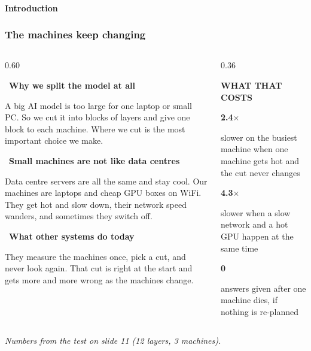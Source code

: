 \documentclass[aspectratio=169,11pt]{beamer}
\newcommand{\kefoot}[1]{%
  \vfill{\scriptsize\itshape\color{kemuted}#1}%
}
\newcommand{\kecard}[3][kemist]{%
  \begin{beamercolorbox}[wd=#2,sep=6pt,rounded=true]{}%
    \colorbox{#1}{\begin{minipage}{\dimexpr#2-14pt\relax}#3\end{minipage}}%
  \end{beamercolorbox}}
\newcommand{\kedot}[2][keamber]{%
  \tikz[baseline=(n.base)]{\node[circle,fill=#1,text=white,inner sep=1.6pt,
    font=\scriptsize\bfseries,minimum size=1.6em] (n) {#2};}}
\newcommand{\kehead}[1]{{\bfseries\color{keink}#1}}
\newcommand{\kesub}[1]{{\footnotesize\color{kebody}#1}}
\begin{document}
\begin{frame}[shrink=20]
  \framesubtitle{Introduction}
  \frametitle{The machines keep changing}
  \begin{columns}[T]
  \begin{column}{0.60\textwidth}
    \kecard{\textwidth}{%
      \kedot[keteal]{1}\ \kehead{Why we split the model at all}\par\vspace{0.3em}
      \kesub{A big AI model is too large for one laptop or small PC. So we
      cut it into blocks of layers and give one block to each machine. Where we
      cut is the most important choice we make.}}\vspace{0.4em}
    \kecard{\textwidth}{%
      \kedot[keteal]{2}\ \kehead{Small machines are not like data centres}\par\vspace{0.3em}
      \kesub{Data centre servers are all the same and stay cool. Our
      machines are laptops and cheap GPU boxes on WiFi. They get hot and slow
      down, their network speed wanders, and sometimes they switch off.}}\vspace{0.4em}
    \kecard{\textwidth}{%
      \kedot{3}\ \kehead{What other systems do today}\par\vspace{0.3em}
      \kesub{They measure the machines once, pick a cut, and never look
      again. That cut is right at the start and gets more and more wrong as the
      machines change.}}
  \end{column}
  \begin{column}{0.36\textwidth}
    \colorbox{keink}{\begin{minipage}{\dimexpr\textwidth-14pt\relax}
      \vspace{0.4em}
      {\scriptsize\bfseries\color{keamber}WHAT THAT COSTS}\par\vspace{0.8em}
      {\headfont\Huge\bfseries\color{white}2.4$\times$}\par
      {\scriptsize\color{white!62!keink}slower on the busiest machine when
       one machine gets hot and the cut never changes}\par\vspace{0.9em}
      {\headfont\Huge\bfseries\color{white}4.3$\times$}\par
      {\scriptsize\color{white!62!keink}slower when a slow network and a hot
       GPU happen at the same time}\par\vspace{0.9em}
      {\headfont\Huge\bfseries\color{white}0}\par
      {\scriptsize\color{white!62!keink}answers given after one machine
       dies, if nothing is re-planned}
      \vspace{0.5em}
    \end{minipage}}
  \end{column}
  \end{columns}
  \kefoot{Numbers from the test on slide 11 (12 layers, 3 machines).}
\end{frame}
\end{document}
